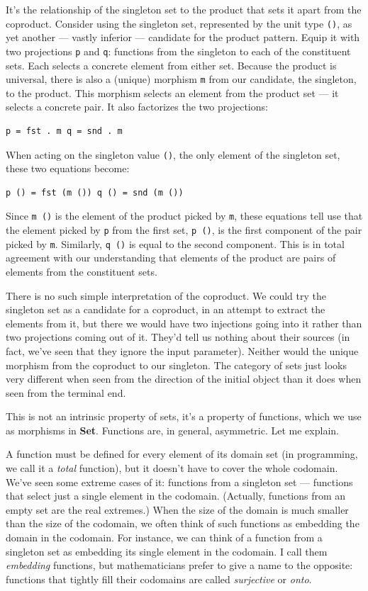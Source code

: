 It's the relationship of the singleton set to the product that sets it
apart from the coproduct. Consider using the singleton set, represented
by the unit type \texttt{()}, as yet another --- vastly inferior ---
candidate for the product pattern. Equip it with two projections
\texttt{p} and \texttt{q}: functions from the singleton to each of the
constituent sets. Each selects a concrete element from either set.
Because the product is universal, there is also a (unique) morphism
\texttt{m} from our candidate, the singleton, to the product. This
morphism selects an element from the product set --- it selects a
concrete pair. It also factorizes the two projections:

\begin{verbatim}
p = fst . m q = snd . m
\end{verbatim}

When acting on the singleton value \texttt{()}, the only element of the
singleton set, these two equations become:

\begin{verbatim}
p () = fst (m ()) q () = snd (m ())
\end{verbatim}

Since \texttt{m\ ()} is the element of the product picked by \texttt{m},
these equations tell use that the element picked by \texttt{p} from the
first set, \texttt{p\ ()}, is the first component of the pair picked by
\texttt{m}. Similarly, \texttt{q\ ()} is equal to the second component.
This is in total agreement with our understanding that elements of the
product are pairs of elements from the constituent sets.

There is no such simple interpretation of the coproduct. We could try
the singleton set as a candidate for a coproduct, in an attempt to
extract the elements from it, but there we would have two injections
going into it rather than two projections coming out of it. They'd tell
us nothing about their sources (in fact, we've seen that they ignore the
input parameter). Neither would the unique morphism from the coproduct
to our singleton. The category of sets just looks very different when
seen from the direction of the initial object than it does when seen
from the terminal end.

This is not an intrinsic property of sets, it's a property of functions,
which we use as morphisms in \textbf{Set}. Functions are, in general,
asymmetric. Let me explain.

A function must be defined for every element of its domain set (in
programming, we call it a \emph{total} function), but it doesn't have to
cover the whole codomain. We've seen some extreme cases of it: functions
from a singleton set --- functions that select just a single element in
the codomain. (Actually, functions from an empty set are the real
extremes.) When the size of the domain is much smaller than the size of
the codomain, we often think of such functions as embedding the domain
in the codomain. For instance, we can think of a function from a
singleton set as embedding its single element in the codomain. I call
them \emph{embedding} functions, but mathematicians prefer to give a
name to the opposite: functions that tightly fill their codomains are
called \emph{surjective} or \emph{onto}.


